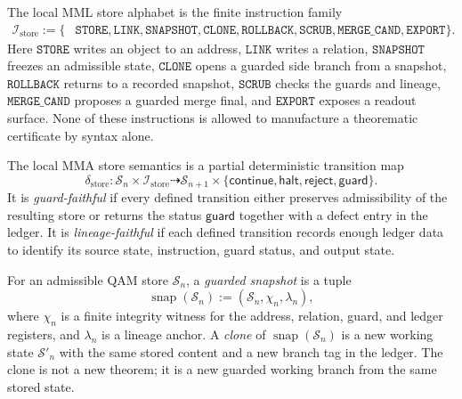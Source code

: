\begin{definition}\label{def:mml-store-instructions}
The local MML store alphabet is the finite instruction family
\[
\begin{split}
 \mathcal I_{\mathrm{store}}
 :=\{&\texttt{STORE},\texttt{LINK},\texttt{SNAPSHOT},\texttt{CLONE},\texttt{ROLLBACK},\texttt{SCRUB},\texttt{MERGE\_CAND},\texttt{EXPORT}\}.
\end{split}
\]
Here \(\texttt{STORE}\) writes an object to an address, \(\texttt{LINK}\) writes a relation, \(\texttt{SNAPSHOT}\) freezes an admissible state, \(\texttt{CLONE}\) opens a guarded side branch from a snapshot, \(\texttt{ROLLBACK}\) returns to a recorded snapshot, \(\texttt{SCRUB}\) checks the guards and lineage, \(\texttt{MERGE\_CAND}\) proposes a guarded merge final, and \(\texttt{EXPORT}\) exposes a readout surface. None of these instructions is allowed to manufacture a theorematic certificate by syntax alone.
\end{definition}

\begin{definition}\label{def:mma-store-transition}
The local MMA store semantics is a partial deterministic transition map
\[
 \delta_{\mathrm{store}}
 :
 \mathcal S_n\times\mathcal I_{\mathrm{store}}
 \dashrightarrow
 \mathcal S_{n+1}\times
 \{\mathsf{continue},\mathsf{halt},\mathsf{reject},\mathsf{guard}\}.
\]
It is \emph{guard-faithful} if every defined transition either preserves admissibility of the resulting store or returns the status \(\mathsf{guard}\) together with a defect entry in the ledger. It is \emph{lineage-faithful} if each defined transition records enough ledger data to identify its source state, instruction, guard status, and output state.
\end{definition}

\begin{definition}\label{def:qam-store-snapshot}
For an admissible QAM store \(\mathcal S_n\), a \emph{guarded snapshot} is a tuple
\[
 \operatorname{snap}(\mathcal S_n)
 :=
 (\mathcal S_n,\chi_n,\lambda_n),
\]
where \(\chi_n\) is a finite integrity witness for the address, relation, guard, and ledger registers, and \(\lambda_n\) is a lineage anchor. A \emph{clone} of \(\operatorname{snap}(\mathcal S_n)\) is a new working state \(\mathcal S'_n\) with the same stored content and a new branch tag in the ledger. The clone is not a new theorem; it is a new guarded working branch from the same stored state.
\end{definition}

